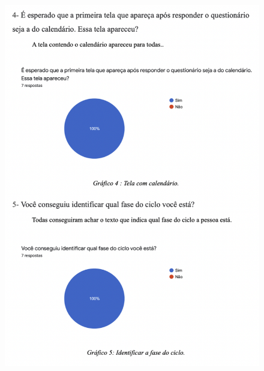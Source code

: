 \begin{apendicesenv}
    \begin{figure}[ht]
        \centering
        \includegraphics[keepaspectratio=true,scale=0.8]{figuras/ap3.png}
    \end{figure}
    \begin{figure}[ht]
        \centering

\end{figure}
\end{apendicesenv}
